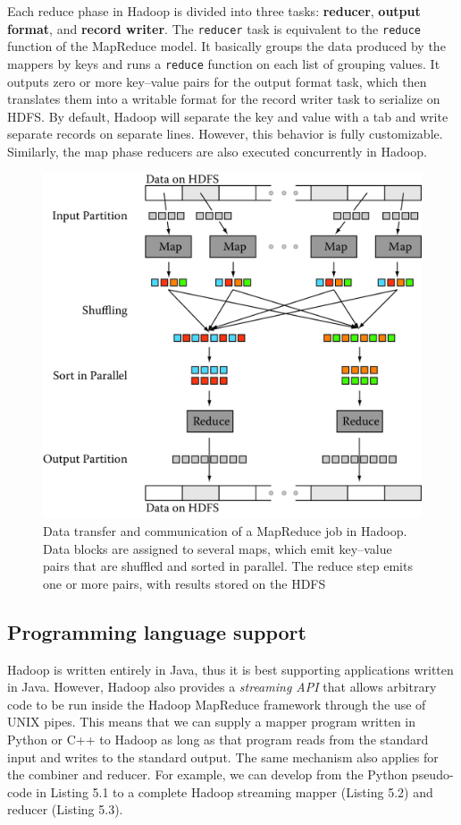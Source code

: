 \documentclass[]{krantz}
\begin{document}
Each reduce phase in Hadoop is divided into three tasks:
\textbf{reducer}, \textbf{output format}, and \textbf{record writer}.
The \texttt{reducer} task is equivalent to the \texttt{reduce} function
of the MapReduce model. It basically groups the data produced by the
mappers by keys and runs a \texttt{reduce} function on each list of
grouping values. It outputs zero or more key--value pairs for the output
format task, which then translates them into a writable format for the
record writer task to serialize on HDFS. By default, Hadoop will
separate the key and value with a tab and write separate records on
separate lines. However, this behavior is fully customizable. Similarly,
the map phase reducers are also executed concurrently in Hadoop.

\begin{figure}

{\centering \includegraphics[width=0.7\linewidth]{ChapterParallel/figures/hadoop} 

}

\caption{Data transfer and communication of a MapReduce job in Hadoop. Data blocks are assigned to several maps, which emit key--value pairs that are shuffled and sorted in parallel. The reduce step emits one or more pairs, with results stored on the HDFS}\label{fig:hadoop}
\end{figure}

\subsection{Programming language
support}\label{programming-language-support}

Hadoop is written entirely in Java, thus it is best supporting
applications written in Java. However, Hadoop also provides a
\emph{streaming API} that allows arbitrary code to be run inside the
Hadoop MapReduce framework through the use of UNIX pipes. This means
that we can supply a mapper program written in Python or C++ to Hadoop
as long as that program reads from the standard input and writes to the
standard output. The same mechanism also applies for the combiner and
reducer. For example, we can develop from the Python pseudo-code in
Listing 5.1 to a complete Hadoop streaming mapper (Listing 5.2) and
reducer (Listing 5.3).
\end{document}
